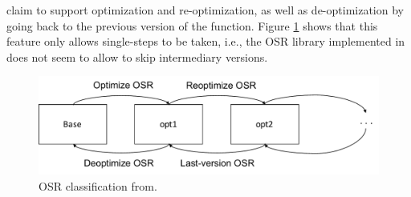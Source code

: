  claim to support optimization and re-optimization, as well as de-optimization by going back to the previous version of the function.
Figure \ref{OSR classification} shows that this feature only allows single-steps to be taken, i.e., the OSR library implemented in\cite{lameed2013modular} does not seem to allow to skip intermediary versions.\\

\begin{figure}[h]
\centering
\includegraphics[scale=0.5]{Figures/OSRClassification}
\decoRule
\caption[OSR classification]{OSR classification from\cite{lameed2013modular}.}
\label{OSR classification}
\end{figure}

